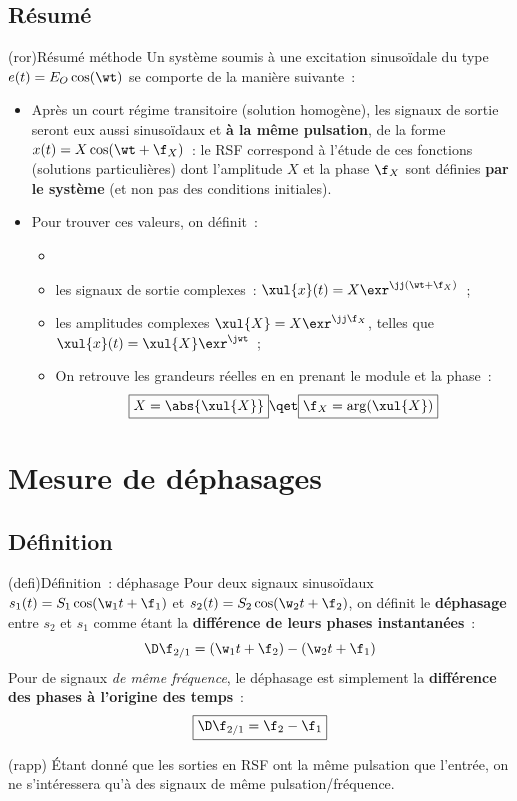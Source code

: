 \documentclass[../../main/main.tex]{subfiles}
\begin{document}
\subsection{Résumé}

\begin{tcb}(ror){Résumé méthode}
	Un système soumis à une excitation sinusoïdale du type $e(t) = E_O\cos(\wt)$ se
	comporte de la manière suivante~:
	\begin{itemize}
		\item Après un court régime transitoire (solution homogène), les signaux de
		      sortie seront eux aussi sinusoïdaux et \textbf{à la même pulsation}, de
		      la forme $x(t) = X\cos(\wt+\f_X)$~: le RSF correspond à l'étude de ces
		      fonctions (solutions particulières) dont l'amplitude $X$ et la phase
		      $\f_X$ sont définies \textbf{par le système} (et non pas des conditions
		      initiales).
		\item Pour trouver ces valeurs, on définit~:
		      \begin{itemize}
			      \item {}
			      \item les signaux de sortie complexes~: $\xul{x}(t) =
				            X\exr^{\jj(\wt+\f_X)}$~;
			      \item les amplitudes complexes $\xul{X} = X\exr^{\jj\f_X}$,
			            telles que $\xul{x}(t) = \xul{X}\exr^{\jwt}$~;
			      \item On retrouve les grandeurs réelles en en prenant le module et
			            la phase~:
			            \[ \boxed{X = \abs{\xul{X}}}
				            \qet
				            \boxed{\f_X = \arg(\xul{X})}
			            \]
		      \end{itemize}
	\end{itemize}
\end{tcb}

\section{Mesure de déphasages}
\subsection{Définition}
\begin{tcb}(defi){Définition~: déphasage}
	Pour deux signaux sinusoïdaux $s_1(t) = S_1\cos(\w_1t+\f_1)$ et $s_2(t) =
		S_2\cos(\w_2t+\f_2)$, on définit le \textbf{déphasage} entre $s_2$ et $s_1$
	comme étant la \textbf{différence de leurs phases instantanées}~:
	\[\D\f_{2/1} = (\w_1t + \f_2) - (\w_2t+\f_1)\]
	Pour de signaux \textit{de même fréquence}, le déphasage est simplement la
	\textbf{différence des phases à l'origine des temps}~:
	\[\boxed{\D\f_{2/1} = \f_2 - \f_1}\]
\end{tcb}
\begin{tcb}(rapp){}
	Étant donné que les sorties en RSF ont la même pulsation que l'entrée, on ne
	s'intéressera qu'à des signaux de même pulsation/fréquence.
\end{tcb}
\end{document}
